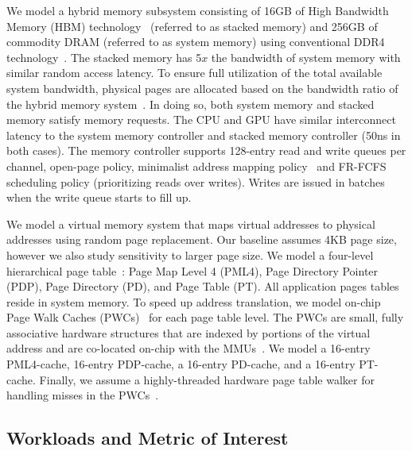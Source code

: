 We model a hybrid memory subsystem consisting of 16GB of High
Bandwidth Memory (HBM) technology~\cite{hbm-spec} (referred to as
stacked memory) and 256GB of commodity DRAM (referred to as system
memory) using conventional DDR4 technology~\cite{ddr4-spec}. The
stacked memory has 5$x$ the bandwidth of system memory with similar
random access latency. To ensure full utilization of the total
available system bandwidth, physical pages are allocated based on the
bandwidth ratio of the hybrid memory system~\cite{bwa,batman}. In
doing so, both system memory and stacked memory satisfy memory
requests. The CPU and GPU have similar interconnect latency to the
system memory controller and stacked memory controller (50ns in both
cases). The memory controller supports 128-entry read and write queues
per channel, open-page policy, minimalist address mapping
policy~\cite{minimalist} and FR-FCFS scheduling policy (prioritizing
reads over writes). Writes are issued in batches when the write queue
starts to fill up.


We model a virtual memory system that maps virtual addresses to
physical addresses using random page replacement. Our baseline assumes
4KB page size, however we also study sensitivity to larger page size.
We model a four-level hierarchical page table~\cite{SkipPT}: Page Map
Level 4 (PML4), Page Directory Pointer (PDP), Page Directory (PD), and
Page Table (PT). All application pages tables reside in system memory.
To speed up address translation, we model on-chip Page Walk Caches
(PWCs)~\cite{SkipPT, MMUcaches} for each page table level. The PWCs
are small, fully associative hardware structures that are indexed by
portions of the virtual address and are co-located on-chip with the
MMUs~\cite{MMUcaches}. We model a 16-entry PML4-cache, 16-entry
PDP-cache, a 16-entry PD-cache, and a 16-entry
PT-cache\cite{MMUcaches}. Finally, we assume a highly-threaded
hardware page table walker for handling misses in the
PWCs~\cite{power2014supporting, pichaigpu}.

\subsection{Workloads and Metric of Interest}

